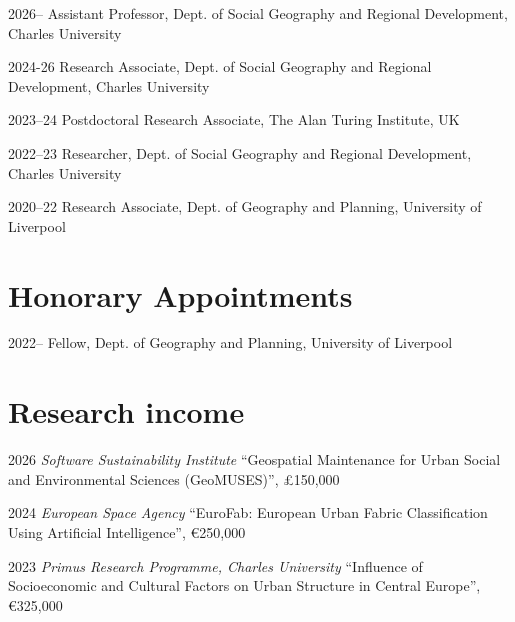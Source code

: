\documentclass[11pt,a4paper]{report}
\begin{document}
    \begin{tablist}
        \item[2026--] \tab{}Assistant Professor, Dept. of Social Geography and Regional Development, Charles University
        
        \item[2024-26] \tab{}Research Associate, Dept. of Social Geography and Regional Development, Charles University

        \item[2023--24] \tab{}Postdoctoral Research Associate, The Alan Turing Institute, UK

        \item[2022--23] \tab{}Researcher, Dept. of Social Geography and Regional Development, Charles University

        \item[2020--22] \tab{}Research Associate, Dept. of Geography and Planning, University of Liverpool

    \end{tablist}


    \section*{Honorary Appointments}

    \begin{tablist}

        \item[2022--] \tab{}Fellow, Dept. of Geography and Planning, University of Liverpool
    \end{tablist}

    \section*{Research income}

    \begin{tablist}

        \item[2026] \tab{}\textit{Software Sustainability Institute} \enquote{Geospatial Maintenance for Urban Social and Environmental Sciences (GeoMUSES)}, £150,000
        \item[2024] \tab{}\textit{European Space Agency} \enquote{EuroFab: European Urban Fabric Classification Using Artificial Intelligence}, €250,000
        \item[2023] \tab{}\textit{Primus Research Programme, Charles University} \enquote{Influence of Socioeconomic and Cultural Factors on Urban Structure in Central Europe}, €325,000

    \end{tablist}
\end{document}
